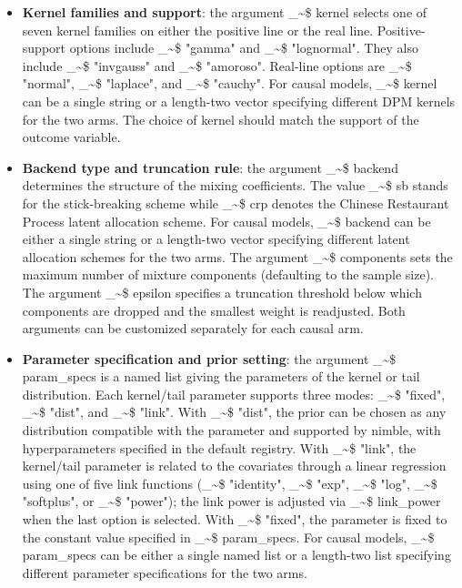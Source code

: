 \documentclass[preprint,12pt,authoryear]{elsarticle}
\makeatletter
\newcommand{\pkg}[1]{\textsf{#1}}
\newcommand\code{\bgroup\@makeother\_\@makeother\~\@makeother\$\@codex}
\def\@codex#1{{\normalfont\ttfamily\hyphenchar\font=-1 #1}\egroup}
\makeatother
\begin{document}
\begin{itemize}
\item \textbf{Kernel families and support}: the argument \code{kernel} selects one of seven kernel families on either the positive line or the real line. Positive-support options include \code{"gamma"} and \code{"lognormal"}. They also include \code{"invgauss"} and \code{"amoroso"}. Real-line options are \code{"normal"}, \code{"laplace"}, and \code{"cauchy"}. For causal models, \code{kernel} can be a single string or a length-two vector specifying different DPM kernels for the two arms. The choice of kernel should match the support of the outcome variable.

\item \textbf{Backend type and truncation rule}: the argument \code{backend} determines the structure of the mixing coefficients. The value \code{sb} stands for the stick-breaking scheme while \code{crp} denotes the Chinese Restaurant Process latent allocation scheme. For causal models, \code{backend} can be either a single string or a length-two vector specifying different latent allocation schemes for the two arms. The argument \code{components} sets the maximum number of mixture components (defaulting to the sample size). The argument \code{epsilon} specifies a truncation threshold below which components are dropped and the smallest weight is readjusted. Both arguments can be customized separately for each causal arm.

\item \textbf{Parameter specification and prior setting}: the argument \code{param_specs} is a named list giving the parameters of the kernel or tail distribution. Each kernel/tail parameter supports three modes: \code{"fixed"}, \code{"dist"}, and \code{"link"}. With \code{"dist"}, the prior can be chosen as any distribution compatible with the parameter and supported by \pkg{nimble}, with hyperparameters specified in the default registry. With \code{"link"}, the kernel/tail parameter is related to the covariates through a linear regression using one of five link functions (\code{"identity"}, \code{"exp"}, \code{"log"}, \code{"softplus"}, or \code{"power"}); the link power is adjusted via \code{link_power} when the last option is selected. With \code{"fixed"}, the parameter is fixed to the constant value specified in \code{param_specs}. For causal models, \code{param_specs} can be either a single named list or a length-two list specifying different parameter specifications for the two arms.
\end{itemize}
\end{document}
